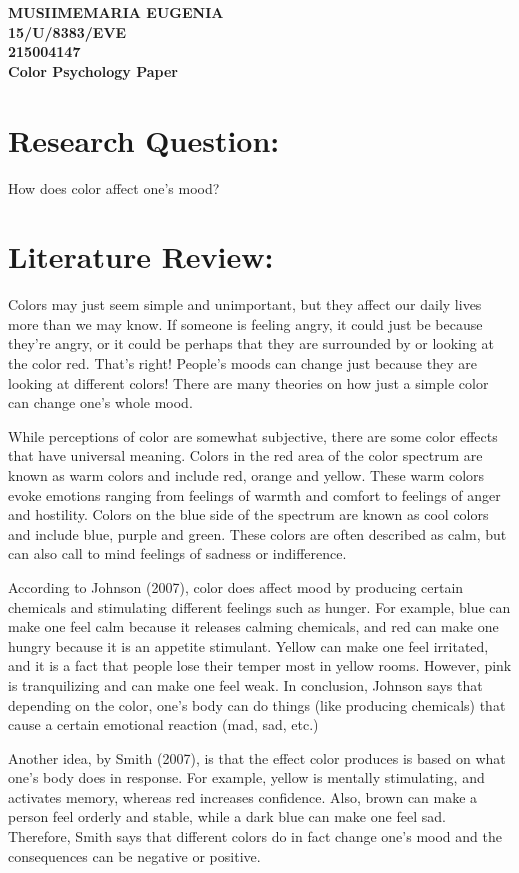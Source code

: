 \documentclass[12pt, letterpaper]{article}
\date{}
\begin{document}
\noindent
\textbf{MUSIIMEMARIA EUGENIA\\
15/U/8383/EVE\\
215004147\\
Color Psychology Paper\\}

\section{Research Question:}
How does color affect one’s mood?   

\section{Literature Review:}
	
	Colors may just seem simple and unimportant, but they affect our daily lives more than we may know. If someone is feeling angry, it could just be because they’re angry, or it could be perhaps that they are surrounded by or looking at the color red. That’s right! People’s moods can change just because they are looking at different colors! There are many theories on how just a simple color can change one’s whole mood.\par
	While perceptions of color are somewhat subjective, there are some color effects that have universal meaning. Colors in the red area of the color spectrum are known as warm colors and include red, orange and yellow.
These warm colors evoke emotions ranging from feelings of warmth and comfort to feelings of anger and hostility.
Colors on the blue side of the spectrum are known as cool colors and include blue, purple and green. These colors are often described as calm, but can also call to mind feelings of sadness or indifference.\par
	According to Johnson (2007), color does affect mood by producing certain chemicals and stimulating different feelings such as hunger. For example, blue can make one feel calm because it releases calming chemicals, and red can make one hungry because it is an appetite stimulant. Yellow can make one feel irritated, and it is a fact that people lose their temper most in yellow rooms. However, pink is tranquilizing and can make one feel weak. In conclusion, Johnson says that depending on the color, one’s body can do things (like producing chemicals) that cause a certain emotional reaction (mad, sad, etc.)\par 
	Another idea, by Smith (2007), is that the effect color produces is based on what one’s body does in response. For example, yellow is mentally stimulating, and activates memory, whereas red increases confidence. Also, brown can make a person feel orderly and stable, while a dark blue can make one feel sad. Therefore, Smith says that different colors do in fact change one’s mood and the consequences can be negative or positive.\par
\end{document}
